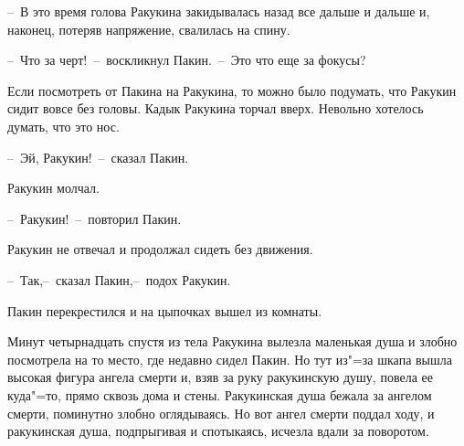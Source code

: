 --~В это время голова Ракукина закидывалась назад все дальше и дальше и, наконец, потеряв напряжение, свалилась на спину.

--~Что за черт!~--~воскликнул Пакин.~--~Это что еще за фокусы?

Если посмотреть от Пакина на Ракукина, то можно было подумать, что Ракукин сидит вовсе без головы. 
Кадык Ракукина торчал вверх.  
Невольно хотелось думать, что это нос.

--~Эй, Ракукин!~--~сказал Пакин. 

Ракукин молчал.

--~Ракукин!~--~повторил Пакин. 

Ракукин не отвечал и продолжал сидеть без движения.

--~Так,--~сказал Пакин,--~подох Ракукин. 

Пакин перекрестился и на цыпочках вышел из комнаты.

Минут четырнадцать спустя из тела Ракукина вылезла маленькая душа и злобно посмотрела на то место, где недавно сидел Пакин.
Но тут из"=за шкапа вышла высокая фигура ангела смерти и, взяв за руку ракукинскую душу, повела ее куда"=то, прямо сквозь дома и стены. 
Ракукинская душа бежала за ангелом смерти, поминутно злобно оглядываясь. 
Но вот ангел смерти поддал ходу, и ракукинская душа, подпрыгивая и спотыкаясь, исчезла вдали за поворотом.
